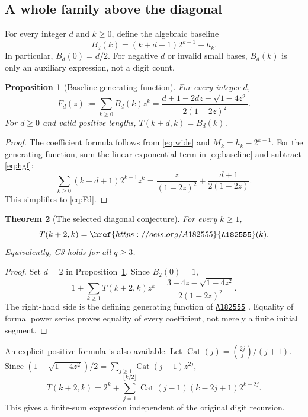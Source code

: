 \documentclass[11pt,letterpaper]{article}
\numberwithin{equation}{section}
\newtheorem{theorem}{Theorem}[section]
\newtheorem{proposition}[theorem]{Proposition}
\theoremstyle{definition}
\newcommand{\Cat}{\operatorname{Cat}}
\newcommand{\OEIS}[1]{\href{https://oeis.org/#1}{\texttt{#1}}}
\begin{document}
\subsection{A whole family above the diagonal}
For every integer $d$ and $k\ge0$, define the algebraic baseline
\begin{equation}\label{eq:baseline}
B_d(k)=(k+d+1)2^{k-1}-h_k.
\end{equation}
In particular, $B_d(0)=d/2$.  For negative $d$ or invalid small bases,
$B_d(k)$ is only an auxiliary expression, not a digit count.

\begin{proposition}[Baseline generating function]\label{prop:baseline}
For every integer $d$,
\begin{equation}\label{eq:Fd}
F_d(z):=\sum_{k\ge0}B_d(k)z^k
=\frac{d+1-2dz-\sqrt{1-4z^2}}{2(1-2z)^2}.
\end{equation}
For $d\ge0$ and valid positive lengths,
$T(k+d,k)=B_d(k)$.
\end{proposition}
\begin{proof}
The coefficient formula follows from
\eqref{eq:wide} and $M_k=h_k-2^{k-1}$.
For the generating function, sum the linear-exponential term in
\eqref{eq:baseline} and subtract \eqref{eq:hgf}:
\[
\sum_{k\ge0}(k+d+1)2^{k-1}z^k
=\frac{z}{(1-2z)^2}+\frac{d+1}{2(1-2z)}.
\]
This simplifies to \eqref{eq:Fd}.
\end{proof}

\begin{theorem}[The selected diagonal conjecture]\label{thm:C3}
For every $k\ge1$,
\begin{equation}\label{eq:C3}
T(k+2,k)=\OEIS{A182555}(k).
\end{equation}
Equivalently, C3 holds for all $q\ge3$.
\end{theorem}
\begin{proof}
Set $d=2$ in Proposition~\ref{prop:baseline}.  Since $B_2(0)=1$,
\begin{equation}\label{eq:A182GF}
1+\sum_{k\ge1}T(k+2,k)z^k
=\frac{3-4z-\sqrt{1-4z^2}}{2(1-2z)^2}.
\end{equation}
The right-hand side is the defining generating function of
\OEIS{A182555} \cite{oeis182555}.  Equality of formal power series proves
equality of every coefficient, not merely a finite initial segment.
\end{proof}

An explicit positive formula is also available.  Let
$\Cat(j)=\binom{2j}{j}/(j+1)$.  Since
$(1-\sqrt{1-4z^2})/2=\sum_{j\ge1}\Cat(j-1)z^{2j}$,
\begin{equation}\label{eq:positivecatalan}
T(k+2,k)=2^k+
\sum_{j=1}^{\lfloor k/2\rfloor}
\Cat(j-1)(k-2j+1)2^{k-2j}.
\end{equation}
This gives a finite-sum expression independent of the original digit
recursion.
\end{document}
